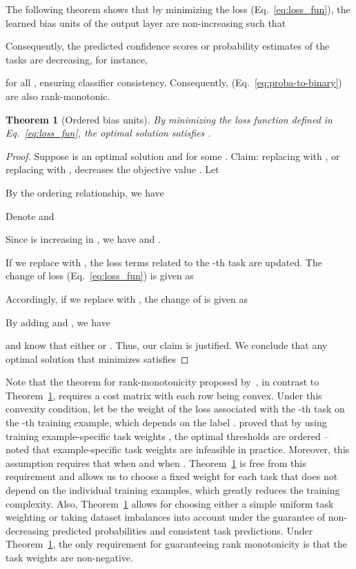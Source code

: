 \documentclass[times,twocolumn,final,authoryear]{elsarticle}
\newtheorem{theorem}{Theorem}
\begin{document}
The following theorem shows that by minimizing the loss  (Eq.~\ref{eq:loss_fun}), the learned bias units of the output layer are non-increasing such that 



Consequently, the predicted confidence scores or probability estimates of the  tasks are decreasing, for instance, 


	

\noindent for all , ensuring classifier consistency. Consequently,  (Eq.~\ref{eq:proba-to-binary}) are also rank-monotonic.
\begin{theorem}[Ordered bias units]\label{th:ordered_thres}
 By minimizing the loss function defined in Eq.~\ref{eq:loss_fun}, the optimal solution  satisfies . 
\end{theorem}

\begin{proof}
Suppose  is an optimal solution and {} for some . Claim: replacing  with  , or replacing  with , decreases the objective value . Let 

By the ordering relationship, we have 

\noindent Denote  and 

Since  is increasing in , we have
 and . 

\noindent If we replace  with , the loss terms related to the -th task are updated.
The change of loss  (Eq.~\ref{eq:loss_fun}) is given as


\noindent Accordingly, if we replace  with , the change of  is given as 


\noindent By adding  and , we have

and know that either  or .
 Thus, our claim is justified. We conclude that any optimal solution  that minimizes  satisfies 
 
\end{proof}




Note that the theorem for rank-monotonicity proposed by~\cite{li2007ordinal}, in contrast to Theorem~\ref{th:ordered_thres}, requires a cost matrix  with each row  being convex. Under this convexity condition, let  be the weight of the loss associated with the -th task on the -th training example, which depends on the label . \cite{li2007ordinal} proved that by using  training example-specific task weights ,  the optimal thresholds are ordered -- ~\cite{niu2016ordinal} noted that example-specific task weights are infeasible in practice. Moreover, this assumption requires that  when  and  when . Theorem~\ref{th:ordered_thres} is free from this requirement and allows us to choose a fixed weight for each task that does not depend on the individual training examples, which greatly reduces the training complexity. Also, Theorem~\ref{th:ordered_thres} allows for choosing either a simple uniform task weighting or taking dataset imbalances into account under the guarantee of non-decreasing predicted probabilities and consistent task predictions. Under Theorem~\ref{th:ordered_thres}, the only requirement for guaranteeing rank monotonicity is that the task weights are non-negative.
\end{document}
